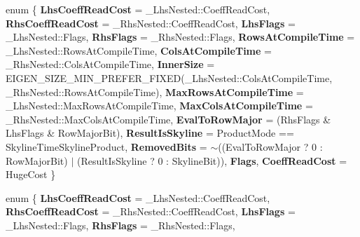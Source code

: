 \begin{DoxyCompactItemize}
\item 
\mbox{\label{struct_eigen_1_1internal_1_1traits_3_01_skyline_product_3_01_lhs_nested_00_01_rhs_nested_00_01_product_mode_01_4_01_4_a9d78a4d42bd3aec77e080d1643f2efb8}} 
enum \{ \newline
{\bfseries Lhs\+Coeff\+Read\+Cost} = \+\_\+\+Lhs\+Nested\+:\+:Coeff\+Read\+Cost, 
{\bfseries Rhs\+Coeff\+Read\+Cost} = \+\_\+\+Rhs\+Nested\+:\+:Coeff\+Read\+Cost, 
{\bfseries Lhs\+Flags} = \+\_\+\+Lhs\+Nested\+:\+:Flags, 
{\bfseries Rhs\+Flags} = \+\_\+\+Rhs\+Nested\+:\+:Flags, 
\newline
{\bfseries Rows\+At\+Compile\+Time} = \+\_\+\+Lhs\+Nested\+:\+:Rows\+At\+Compile\+Time, 
{\bfseries Cols\+At\+Compile\+Time} = \+\_\+\+Rhs\+Nested\+:\+:Cols\+At\+Compile\+Time, 
{\bfseries Inner\+Size} = E\+I\+G\+E\+N\+\_\+\+S\+I\+Z\+E\+\_\+\+M\+I\+N\+\_\+\+P\+R\+E\+F\+E\+R\+\_\+\+F\+I\+X\+ED(\+\_\+\+Lhs\+Nested\+:\+:Cols\+At\+Compile\+Time, \+\_\+\+Rhs\+Nested\+:\+:Rows\+At\+Compile\+Time), 
{\bfseries Max\+Rows\+At\+Compile\+Time} = \+\_\+\+Lhs\+Nested\+:\+:Max\+Rows\+At\+Compile\+Time, 
\newline
{\bfseries Max\+Cols\+At\+Compile\+Time} = \+\_\+\+Rhs\+Nested\+:\+:Max\+Cols\+At\+Compile\+Time, 
{\bfseries Eval\+To\+Row\+Major} = (Rhs\+Flags \& Lhs\+Flags \& Row\+Major\+Bit), 
{\bfseries Result\+Is\+Skyline} = Product\+Mode == Skyline\+Time\+Skyline\+Product, 
{\bfseries Removed\+Bits} = $\sim$((Eval\+To\+Row\+Major ? 0 \+: Row\+Major\+Bit) $\vert$ (Result\+Is\+Skyline ? 0 \+: Skyline\+Bit)), 
\newline
{\bfseries Flags}, 
{\bfseries Coeff\+Read\+Cost} = Huge\+Cost
 \}
\item 
\mbox{\label{struct_eigen_1_1internal_1_1traits_3_01_skyline_product_3_01_lhs_nested_00_01_rhs_nested_00_01_product_mode_01_4_01_4_ab02247b3465000e26e878ca96bf6d5b3}} 
enum \{ \newline
{\bfseries Lhs\+Coeff\+Read\+Cost} = \+\_\+\+Lhs\+Nested\+:\+:Coeff\+Read\+Cost, 
{\bfseries Rhs\+Coeff\+Read\+Cost} = \+\_\+\+Rhs\+Nested\+:\+:Coeff\+Read\+Cost, 
{\bfseries Lhs\+Flags} = \+\_\+\+Lhs\+Nested\+:\+:Flags, 
{\bfseries Rhs\+Flags} = \+\_\+\+Rhs\+Nested\+:\+:Flags, 

\end{DoxyCompactItemize}
